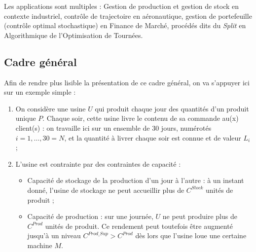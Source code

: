 Les applications sont multiples : Gestion de production et gestion de stock en contexte industriel,  contrôle de trajectoire en aéronautique,  gestion de portefeuille (contrôle optimal stochastique) en Finance de Marché, procédés dits du \textit{Split} en Algorithmique de l'Optimisation de Tournées. 
\subsection{Cadre général}
\label{Cadre_general}
Afin de rendre plus lisible la présentation de ce cadre général, on va s'appuyer ici sur un exemple simple :
\begin{enumerate}
	\item	On considère une usine $U$ qui produit chaque jour des quantités d'un produit unique $P$. Chaque soir, cette usine livre le contenu de sa commande au(x) client(s) : on travaille ici sur un ensemble de 30 jours, numérotés $i = 1,\dots, 30 = N$, et la quantité à livrer chaque soir est connue et de valeur $L_i$ ;
	\item	L'usine est contrainte par des contraintes de capacité :
	\begin{itemize}[label=$\square$]
		\item	Capacité de stockage de la production d'un jour à l'autre : à un instant donné, l'usine de stockage ne peut accueillir plus de $C^{Stock}$ unités de produit ;
		\item	Capacité de production : sur une journée, $U$ ne peut produire plus de $C^{Prod}$ unités de produit. Ce rendement peut toutefois être augmenté jusqu'à un niveau $C^{Prod\_Sup} > C^{Prod}$ dès lors que l'usine loue une certaine machine $M$.
		

\end{itemize}
\end{enumerate}
